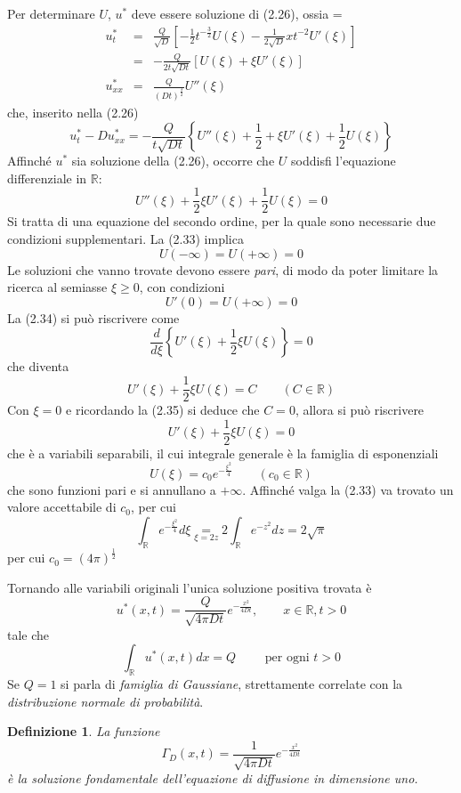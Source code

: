 \documentclass[a4paper,12pt, draft]{article}
\theoremstyle{break}
\newtheorem{definition}{Definizione}[section]
\numberwithin{equation}{section}
\begin{document}
\begin{itemize}
\begin{itemize}
\begin{equation}
\end{equation}
Per determinare $U$, $u^*$ deve essere soluzione di (2.26), ossia
{\everymath = {\displaystyle}
$$
\begin{array}{rcl}
u_t^* & = & \frac{Q}{\sqrt{D}} \left[-\frac{1}{2}t^{-\frac{3}{2}}U(\xi) - \frac{1}{2\sqrt{D}}xt^{-2}U'(\xi) \right]
\\
& = & -\frac{Q}{2t\sqrt{Dt}}\left[U(\xi)+ \xi U'(\xi)\right] \\
u_{xx}^* & = & \frac{Q}{(Dt)^{\frac{3}{2}}}U''(\xi)
\end{array} 
$$
}
che, inserito nella (2.26) 
$$
u_t^* -D u_{xx}^* = -\frac{Q}{t\sqrt{Dt}} \left\lbrace U''(\xi) + \frac{1}{2}+\xi U'(\xi) + \frac{1}{2}U(\xi)\right\rbrace
$$
Affinché $u^*$ sia soluzione della (2.26), occorre che $U$ soddisfi l'equazione differenziale in $\mathbb{R}$:
\begin{equation}
U''(\xi) + \frac{1}{2}\xi U'(\xi) + \frac{1}{2}U(\xi) = 0
\end{equation}
Si tratta di una equazione del secondo ordine, per la quale sono necessarie due condizioni supplementari. La (2.33) implica
$$
U(-\infty) = U(+\infty) = 0 
$$
Le soluzioni che vanno trovate devono essere \emph{pari}, di modo da poter limitare la ricerca al semiasse $\xi \geq 0$, con condizioni
\begin{equation}
U'(0) = U(+\infty) = 0
\end{equation}
La (2.34) si può riscrivere come 
$$
\frac{d}{d\xi} \left\lbrace U'(\xi) + \frac{1}{2}\xi U (\xi) \right\rbrace = 0
$$
che diventa
\begin{equation}
U'(\xi) + \frac{1}{2}\xi U(\xi) = C \qquad (C \in \mathbb{R})
\end{equation}
Con $\xi = 0$ e ricordando la (2.35) si deduce che $C = 0$, allora si può riscrivere
$$
U' (\xi) + \frac{1}{2}\xi U (\xi) = 0
$$
che è a variabili separabili, il cui integrale generale è la famiglia di esponenziali
$$
U(\xi) = c_0e^{-\frac{\xi^2}{4}} \qquad (c_0 \in \mathbb{R})
$$
che sono funzioni pari e si annullano a $+\infty$. Affinché valga la (2.33) va trovato un valore accettabile di $c_0$, per cui
$$
\int_{\mathbb{R}} e^{-\frac{\xi^2}{4}}d\xi \underset{\xi = 2z}{=} 2 \int_{\mathbb{R}} e^{-z^2}dz = 2\sqrt{\pi}
$$
per cui
$c_0 = (4 \pi)^{\frac{1}{2}}$
\end{itemize}
\end{itemize}
Tornando alle variabili originali l'unica soluzione positiva trovata è
$$
u^*(x,t)=\frac{Q}{\sqrt{4\pi Dt}}e^{-\frac{x^2}{4Dt}}, \qquad x \in \mathbb{R}, t > 0
$$
tale che 
$$
\int_{\mathbb{R}} u^* (x,t)dx = Q \qquad \mbox{ per ogni } t>0
$$
Se $Q = 1$ si parla di \emph{famiglia di Gaussiane}, strettamente correlate con la \emph{distribuzione normale di probabilità}.
\begin{definition}
La funzione 
$$
\Gamma_D (x,t) = \frac{1}{\sqrt{4\pi Dt}}e^{-\frac{x^2}{4Dt}}
$$
è la soluzione fondamentale dell'equazione di diffusione in dimensione uno.
\end{definition}
\end{document}
